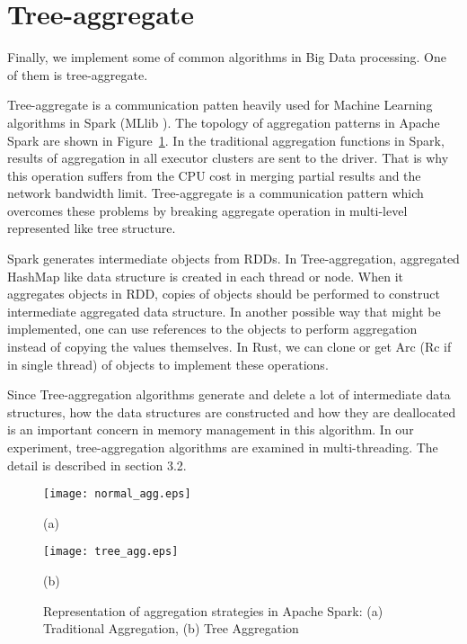 \section{Tree-aggregate}
\label{sec:concept_treeagg}
Finally, we implement some of common algorithms in Big Data processing. One of them is tree-aggregate.

Tree-aggregate is a communication patten heavily used for Machine Learning algorithms in Spark (MLlib \cite{DBLP:journals/jmlr/MengBYSVLFTAOXX16}). 
The topology of aggregation patterns in Apache Spark are shown in Figure~\ref{fig:aggregationk_patttern}. 
In the traditional aggregation functions in Spark, results of aggregation in all executor clusters are sent to the driver. 
That is why this operation suffers from the CPU cost in merging partial results and the network bandwidth limit.
Tree-aggregate is a communication pattern which overcomes these problems by breaking aggregate operation in multi-level represented like tree structure.

Spark generates intermediate objects from RDDs. In Tree-aggregation, aggregated HashMap like data structure is created in each thread or node. 
When it aggregates objects in RDD, copies of objects should be performed to construct intermediate aggregated data structure.
In another possible way that might be implemented, one can use references to the objects to perform aggregation instead of copying the values themselves.
In Rust, we can clone or get Arc (Rc if in single thread) of objects to implement these operations.

Since Tree-aggregation algorithms generate and delete a lot of intermediate data structures, 
how the data structures are constructed and how they are deallocated is an important concern in memory management in this algorithm.
In our experiment, tree-aggregation algorithms are examined in multi-threading. The detail is described in section 3.2.

\begin{figure}[htb]
    \begin{minipage}[t]{0.5\linewidth}\centering
        \texttt{[image: normal\_agg.eps]}
        \medskip
        \centerline{(a)}
        \end{minipage}\hfill
        \begin{minipage}[t]{0.5\linewidth}\centering
        \texttt{[image: tree\_agg.eps]} 
        \medskip
        \centerline{(b)}
    \end{minipage}\hfill
    \caption{Representation of aggregation strategies in Apache Spark: (a) Traditional Aggregation, (b) Tree Aggregation}
    \label{fig:aggregationk_patttern}
\end{figure}

